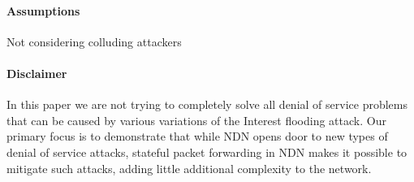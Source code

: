 \paragraph{Assumptions}

Not considering colluding attackers




\paragraph{Disclaimer}
In this paper we are not trying to completely solve all denial of service problems that can be caused by various variations of the Interest flooding attack.
Our primary focus is to demonstrate that while NDN opens door to new types of denial of service attacks, stateful packet forwarding in NDN makes it possible to mitigate such attacks, adding little additional complexity to the network.










